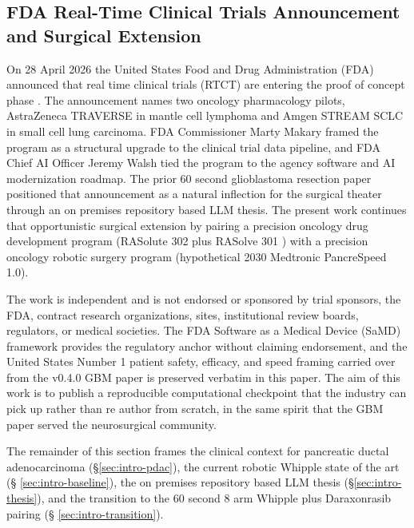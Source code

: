
\subsection{FDA Real-Time Clinical Trials Announcement and Surgical Extension}
\label{sec:intro-fda}

On 28 April 2026 the United States Food and Drug Administration
(FDA) announced that real time clinical trials (RTCT) are entering
the proof of concept phase \cite{fda2026realtime}. The announcement
names two oncology pharmacology pilots, AstraZeneca TRAVERSE in
mantle cell lymphoma and Amgen STREAM SCLC in small cell lung
carcinoma. FDA Commissioner Marty Makary framed the program as a
structural upgrade to the clinical trial data pipeline, and FDA
Chief AI Officer Jeremy Walsh tied the program to the agency
software and AI modernization roadmap. The prior 60 second
glioblastoma resection paper \cite{kawchak_2026_20113157} positioned
that announcement as a natural inflection for the surgical theater
through an on premises repository based LLM thesis. The present
work continues that opportunistic surgical extension by pairing a
precision oncology drug development program (RASolute 302 plus
RASolve 301 \cite{rasolute302, rasolve301}) with a precision
oncology robotic surgery program (hypothetical 2030 Medtronic
PancreSpeed 1.0).

The work is independent and is not endorsed or sponsored by trial
sponsors, the FDA, contract research organizations, sites,
institutional review boards, regulators, or medical societies. The
FDA Software as a Medical Device (SaMD) framework \cite{fda-samd}
provides the regulatory anchor without claiming endorsement, and
the United States Number 1 patient safety, efficacy, and speed
framing carried over from the v0.4.0 GBM paper is preserved
verbatim in this paper. The aim of this work is to publish a
reproducible computational checkpoint that the industry can pick
up rather than re author from scratch, in the same spirit that
the GBM paper served the neurosurgical community.

The remainder of this section frames the clinical context for
pancreatic ductal adenocarcinoma (\S \ref{sec:intro-pdac}), the
current robotic Whipple state of the art (\S
\ref{sec:intro-baseline}), the on premises repository based LLM
thesis (\S \ref{sec:intro-thesis}), and the transition to the 60
second 8 arm Whipple plus Daraxonrasib pairing (\S
\ref{sec:intro-transition}).

